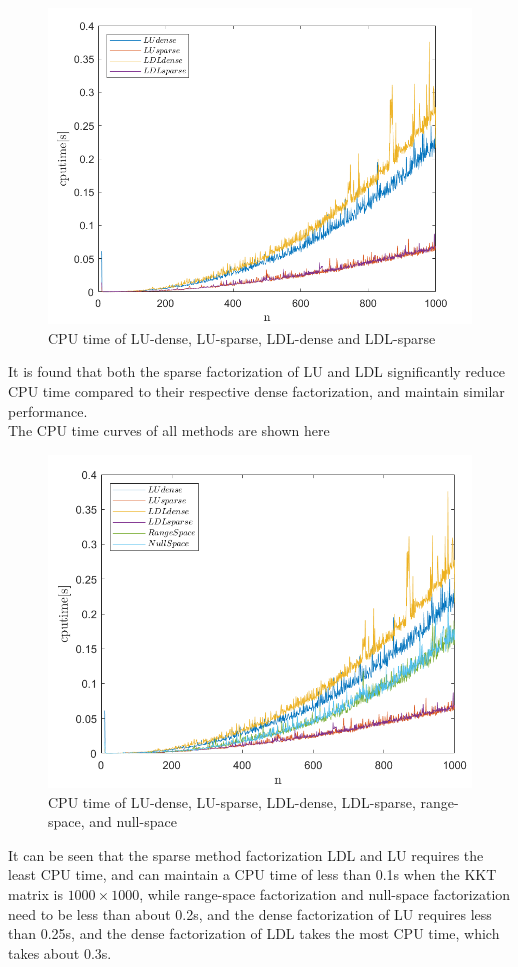 \begin{figure}[H]
\centering
\includegraphics[scale=0.7]{figures/EQ_KKT_LULDL.PNG}
\caption{CPU time of LU-dense, LU-sparse, LDL-dense and LDL-sparse}
\label{fig:labe1.4.2}
\end{figure}
It is found that both the sparse factorization of LU and LDL significantly reduce CPU time compared to their respective dense factorization, and maintain similar performance.\\
The CPU time curves of all methods are shown here
\begin{figure}[H]
\centering
\includegraphics[scale=0.7]{figures/EQ_ALL.PNG}
\caption{CPU time of LU-dense, LU-sparse, LDL-dense, LDL-sparse, range-space, and null-space}
\label{fig:labe1.4.3}
\end{figure}
It can be seen that the sparse method factorization LDL and LU requires the least CPU time, and can maintain a CPU time of less than 0.1s when the KKT matrix is $1000 \times 1000$, while range-space factorization and null-space factorization need to be less than about 0.2s, and the dense factorization of LU requires less than 0.25s, and the dense factorization of LDL takes the most CPU time, which takes about 0.3s.